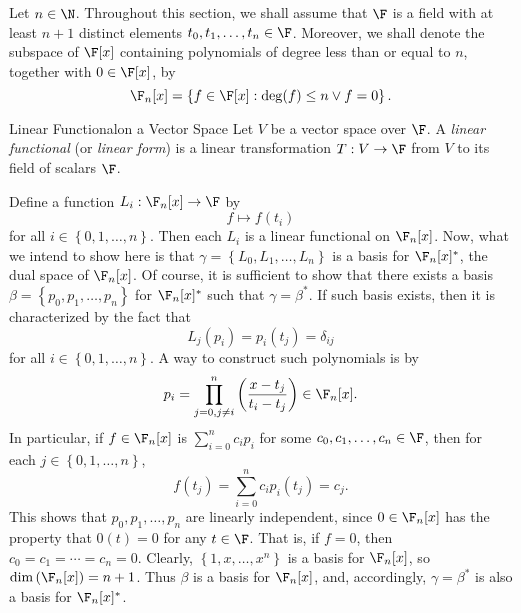 \documentclass[linearalgebraII]{subfiles}
\begin{document}
    \begin{remark}
        Let $n\in\N$. Throughout this section, we shall assume that $\F$ is a field with at least $n+1$ distinct elements $t_0,t_1,\ldots,t_n\in\F$. Moreover, we shall denote the subspace of $\F[x]$ containing polynomials of degree less than or equal to $n$, together with $0\in\F[x]$, by
        \begin{equation*}
            \F_n[x] = \left\lbrace f\in\F[x]:\deg(f)\leq n\lor f=0 \right\rbrace.
        \end{equation*}
    \end{remark}

    \begin{recall}{Linear Functional}{on a Vector Space}
        Let $V$ be a vector space over $\F$. A \emph{linear functional} (or \emph{linear form}) is a linear transformation $T:V\to \F$ from $V$ to its field of scalars $\F$.
    \end{recall}

    \noindent Define a function $L_i:\F_n[x]\to\F$ by
    \begin{equation*}
        f\mapsto f\left( t_i \right) 
    \end{equation*}
    for all $i\in\left\lbrace 0,1,\ldots,n \right\rbrace$. Then each $L_i$ is a linear functional on $\F_n[x]$. Now, what we intend to show here is that $\gamma = \left\lbrace L_0,L_1,\ldots,L_n \right\rbrace$ is a basis for $\F_n[x]^{*}$, the dual space of $\F_n[x]$. Of course, it is sufficient to show that there exists a basis $\beta = \left\lbrace p_0,p_1,\ldots,p_n \right\rbrace$ for $\F_n[x]^{*}$ such that $\gamma = \beta^{*}$. If such basis exists, then it is characterized by the fact that
    \begin{equation*}
        L_j\left( p_i \right) = p_i\left( t_j \right) = \delta_{ij}
    \end{equation*}
    for all $i\in\left\lbrace 0,1,\ldots,n \right\rbrace$. A way to construct such polynomials is by
    \begin{equation*}
        p_i = \prod^{n}_{j=0,j\neq i} \left( \frac{x-t_j}{t_i-t_j} \right) \in\F_n[x].
    \end{equation*}
    In particular, if $f\in\F_n[x]$ is $\sum^{n}_{i=0} c_ip_i$ for some $c_0,c_1,\ldots,c_n\in\F$, then for each $j\in\left\lbrace 0,1,\ldots,n \right\rbrace$,
    \begin{equation*}
        f\left( t_j \right) = \sum^{n}_{i=0} c_ip_i\left( t_j \right) = c_j.
    \end{equation*}
    This shows that $p_0,p_1,\ldots,p_n$ are linearly independent, since $0\in\F_n[x]$ has the property that $0(t)=0$ for any $t\in\F$. That is, if $f=0$, then $c_0=c_1=\cdots=c_n=0$. Clearly, $\left\lbrace 1,x,\ldots,x^n \right\rbrace$ is a basis for $\F_n[x]$, so $\dim\left( \F_n[x] \right) = n+1$. Thus $\beta$ is a basis for $\F_n[x]$, and, accordingly, $\gamma=\beta^{*}$ is also a basis for $\F_n[x]^{*}$.
\end{document}
